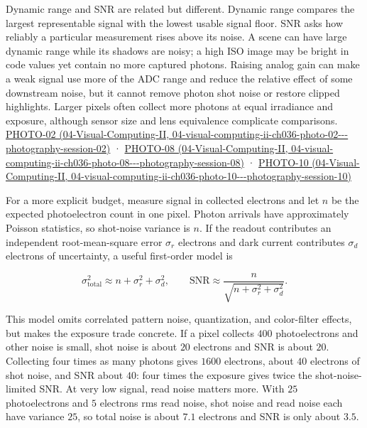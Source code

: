 Dynamic range and SNR are related but different. Dynamic range compares the largest representable signal with the lowest usable signal floor. SNR asks how reliably a particular measurement rises above its noise. A scene can have large dynamic range while its shadows are noisy; a high ISO image may be bright in code values yet contain no more captured photons. Raising analog gain can make a weak signal use more of the ADC range and reduce the relative effect of some downstream noise, but it cannot remove photon shot noise or restore clipped highlights. Larger pixels often collect more photons at equal irradiance and exposure, although sensor size and lens equivalence complicate comparisons. \href{../04-Visual-Computing-II/main.pdf\#nameddest=04-visual-computing-ii-ch036-photo-02---photography-session-02}{PHOTO-02 (04-Visual-Computing-II, 04-visual-computing-ii-ch036-photo-02-\/-\/-photography-session-02)} · \href{../04-Visual-Computing-II/main.pdf\#nameddest=04-visual-computing-ii-ch036-photo-08---photography-session-08}{PHOTO-08 (04-Visual-Computing-II, 04-visual-computing-ii-ch036-photo-08-\/-\/-photography-session-08)} · \href{../04-Visual-Computing-II/main.pdf\#nameddest=04-visual-computing-ii-ch036-photo-10---photography-session-10}{PHOTO-10 (04-Visual-Computing-II, 04-visual-computing-ii-ch036-photo-10-\/-\/-photography-session-10)}

For a more explicit budget, measure signal in collected electrons and let \(n\) be the expected photoelectron count in one pixel. Photon arrivals have approximately Poisson statistics, so shot-noise variance is \(n\). If the readout contributes an independent root-mean-square error \(\sigma_r\) electrons and dark current contributes \(\sigma_d\) electrons of uncertainty, a useful first-order model is

\[
\sigma_{\mathrm{total}}^2\approx n+\sigma_r^2+\sigma_d^2,
\qquad
\mathrm{SNR}\approx\frac{n}{\sqrt{n+\sigma_r^2+\sigma_d^2}}.
\]

This model omits correlated pattern noise, quantization, and color-filter effects, but makes the exposure trade concrete. If a pixel collects \(400\) photoelectrons and other noise is small, shot noise is about \(20\) electrons and SNR is about \(20\). Collecting four times as many photons gives \(1600\) electrons, about \(40\) electrons of shot noise, and SNR about \(40\): four times the exposure gives twice the shot-noise-limited SNR. At very low signal, read noise matters more. With \(25\) photoelectrons and \(5\) electrons rms read noise, shot noise and read noise each have variance \(25\), so total noise is about \(7.1\) electrons and SNR is only about \(3.5\).

